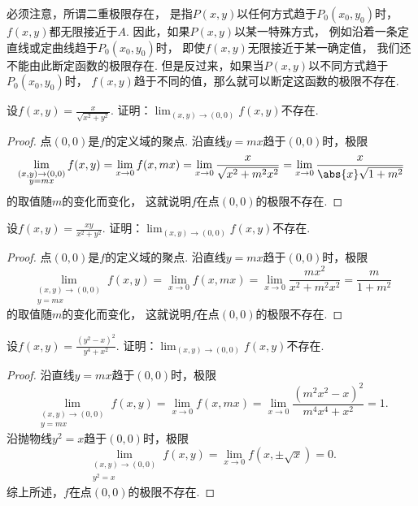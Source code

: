 必须注意，所谓二重极限存在，
是指\(P(x,y)\)以任何方式趋于\(P_0(x_0,y_0)\)时，\(f(x,y)\)都无限接近于\(A\).
因此，如果\(P(x,y)\)以某一特殊方式，
例如沿着一条定直线或定曲线趋于\(P_0(x_0,y_0)\)时，
即使\(f(x,y)\)无限接近于某一确定值，
我们还不能由此断定函数的极限存在.
但是反过来，如果当\(P(x,y)\)以不同方式趋于\(P_0(x_0,y_0)\)时，
\(f(x,y)\)趋于不同的值，那么就可以断定这函数的极限不存在.

\begin{example}
设\(f(x,y) = \frac{x}{\sqrt{x^2+y^2}}\).
证明：\(\lim_{(x,y)\to(0,0)} f(x,y)\)不存在.
\begin{proof}
点\((0,0)\)是\(f\)的定义域的聚点.
沿直线\(y=mx\)趋于\((0,0)\)时，极限\[
	\lim_{\substack{(x,y)\to(0,0) \\ y=mx}} f(x,y)
	= \lim_{x\to0} f(x,mx)
	= \lim_{x\to0} \frac{x}{\sqrt{x^2+m^2x^2}}
	= \lim_{x\to0} \frac{x}{\abs{x} \sqrt{1+m^2}}
\]的取值随\(m\)的变化而变化，
这就说明\(f\)在点\((0,0)\)的极限不存在.
\end{proof}
\end{example}
\begin{example}
设\(f(x,y) = \frac{xy}{x^2+y^2}\).
证明：\(\lim_{(x,y)\to(0,0)} f(x,y)\)不存在.
\begin{proof}
点\((0,0)\)是\(f\)的定义域的聚点.
沿直线\(y=mx\)趋于\((0,0)\)时，极限\[
	\lim_{\substack{(x,y)\to(0,0) \\ y=mx}} f(x,y)
	= \lim_{x\to0} f(x,mx)
	= \lim_{x\to0} \frac{mx^2}{x^2+m^2x^2}
	= \frac{m}{1+m^2}
\]的取值随\(m\)的变化而变化，
这就说明\(f\)在点\((0,0)\)的极限不存在.
\end{proof}
\end{example}
\begin{example}
设\(f(x,y) = \frac{(y^2-x)^2}{y^4+x^2}\).
证明：\(\lim_{(x,y)\to(0,0)} f(x,y)\)不存在.
\begin{proof}
沿直线\(y=mx\)趋于\((0,0)\)时，极限\[
	\lim_{\substack{(x,y)\to(0,0) \\ y=mx}} f(x,y)
	= \lim_{x\to0} f(x,mx)
	= \lim_{x\to0} \frac{(m^2x^2-x)^2}{m^4x^4+x^2}
	= 1.
\]
沿抛物线\(y^2=x\)趋于\((0,0)\)时，极限\[
	\lim_{\substack{(x,y)\to(0,0) \\ y^2=x}} f(x,y)
	= \lim_{x\to0} f(x,\pm\sqrt{x})
	= 0.
\]
综上所述，\(f\)在点\((0,0)\)的极限不存在.
\end{proof}
\end{example}
